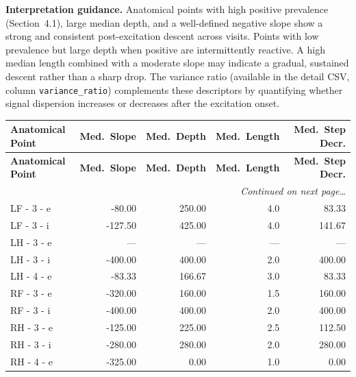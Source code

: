 \documentclass[a4paper,11pt]{article}
\begin{document}
\medskip
\noindent\textbf{Interpretation guidance.}
Anatomical points with high positive prevalence (Section~4.1), large median depth, and a
well-defined negative slope show a strong and consistent post-excitation descent across
visits.
Points with low prevalence but large depth when positive are intermittently reactive.
A high median length combined with a moderate slope may indicate a gradual, sustained
descent rather than a sharp drop.
The variance ratio (available in the detail CSV, column \texttt{variance\_ratio}) complements
these descriptors by quantifying whether signal dispersion increases or decreases after the
excitation onset.

\begin{small}
\begin{longtable}{p{4.5cm}rrrr}
\toprule
\textbf{Anatomical Point} &
\textbf{Med.\ Slope} &
\textbf{Med.\ Depth} &
\textbf{Med.\ Length} &
\textbf{Med.\ Step Decr.} \\
\midrule
\endfirsthead
\toprule
\textbf{Anatomical Point} &
\textbf{Med.\ Slope} &
\textbf{Med.\ Depth} &
\textbf{Med.\ Length} &
\textbf{Med.\ Step Decr.} \\
\midrule
\endhead
\midrule
\multicolumn{5}{r}{\small\emph{Continued on next page\ldots}} \\
\endfoot
\bottomrule
\endlastfoot
LF - 3 - e & -80.00 & 250.00 & 4.0 & 83.33 \\
LF - 3 - i & -127.50 & 425.00 & 4.0 & 141.67 \\
LH - 3 - e & --- & --- & --- & --- \\
LH - 3 - i & -400.00 & 400.00 & 2.0 & 400.00 \\
LH - 4 - e & -83.33 & 166.67 & 3.0 & 83.33 \\
RF - 3 - e & -320.00 & 160.00 & 1.5 & 160.00 \\
RF - 3 - i & -400.00 & 400.00 & 2.0 & 400.00 \\
RH - 3 - e & -125.00 & 225.00 & 2.5 & 112.50 \\
RH - 3 - i & -280.00 & 280.00 & 2.0 & 280.00 \\
RH - 4 - e & -325.00 & 0.00 & 1.0 & 0.00 \\
\end{longtable}
\end{small}
\end{document}
